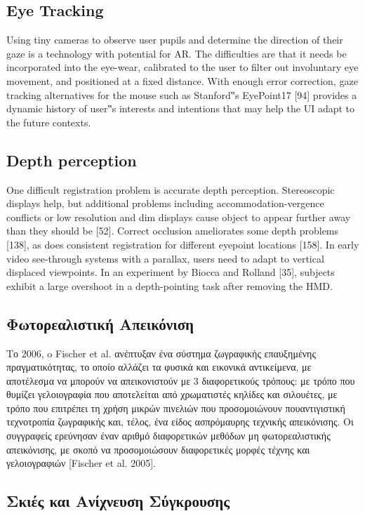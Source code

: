 \subsection{Eye Tracking}
Using tiny cameras to observe user pupils and determine
the direction of their gaze is a technology with potential for
AR. The difficulties are that it needs be incorporated into the
eye-wear, calibrated to the user to filter out involuntary eye
movement, and positioned at a fixed distance. With enough
error correction, gaze tracking alternatives for the mouse
such as Stanford‟s EyePoint17 [94] provides a dynamic history
of user‟s interests and intentions that may help the UI
adapt to the future contexts.


\subsection{Depth perception}
One difficult registration problem is accurate depth perception.
Stereoscopic displays help, but additional problems
including accommodation-vergence conflicts or low resolution
and dim displays cause object to appear further away
than they should be [52]. Correct occlusion ameliorates some
depth problems [138], as does consistent registration for
different eyepoint locations [158].
In early video see-through systems with a parallax, users
need to adapt to vertical displaced viewpoints. In an experiment
by Biocca and Rolland [35], subjects exhibit a large
overshoot in a depth-pointing task after removing the HMD.
\subsection{Φωτορεαλιστική Απεικόνιση}

Το 2006, o Fischer et al. ανέπτυξαν ένα σύστημα ζωγραφικής επαυξημένης πραγματικότητας, το οποίο αλλάζει τα φυσικά και εικονικά αντικείμενα, με αποτέλεσμα να μπορούν να απεικονιστούν με 3 διαφορετικούς τρόπους: με τρόπο που θυμίζει γελοιογραφία που αποτελείται από χρωματιστές κηλίδες και σιλουέτες, με τρόπο που επιτρέπει τη χρήση μικρών πινελιών που προσομοιώνουν πουαντιγιστική τεχνοτροπία ζωγραφικής και, τέλος, ένα είδος ασπρόμαυρης τεχνικής απεικόνισης. Οι συγγραφείς ερεύνησαν έναν αριθμό διαφορετικών μεθόδων μη φωτορεαλιστικής απεικόνισης, με σκοπό να προσομοιώσουν διαφορετικές μορφές τέχνης και γελοιογραφιών [Fischer et al. 2005].


\subsection{Σκιές και Ανίχνευση Σύγκρουσης }


